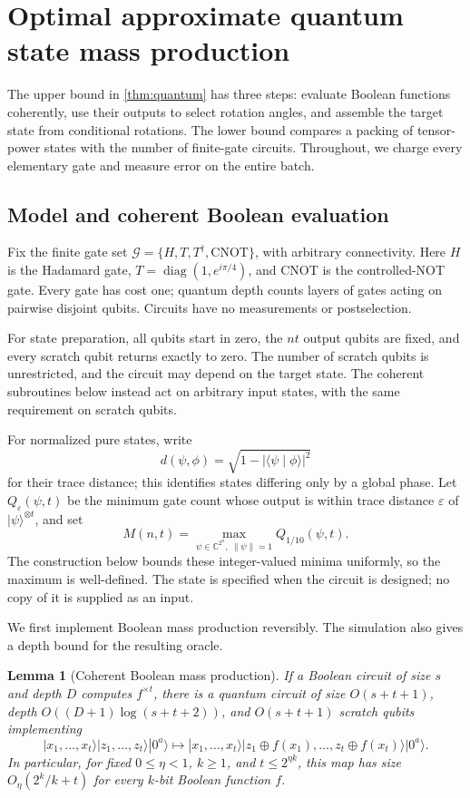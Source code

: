 \documentclass[11pt]{article}
\newtheorem{lemma}[lemma]{Lemma}
\newcommand{\xor}{\mathbin{\oplus}}
\begin{document}
\section{Optimal approximate quantum state mass production}
\label{sec:quantum}

The upper bound in \cref{thm:quantum} has three steps: evaluate Boolean
functions coherently, use their outputs to select rotation angles, and
assemble the target state from conditional rotations.  The lower bound
compares a packing of tensor-power states with the number of finite-gate
circuits.  Throughout, we charge every elementary gate and measure error
on the entire batch.

\subsection{Model and coherent Boolean evaluation}

Fix the finite gate set
$\mathcal G=\{H,T,T^\dagger,\mathrm{CNOT}\}$, with arbitrary connectivity.
Here $H$ is the Hadamard gate, $T=\operatorname{diag}(1,e^{i\pi/4})$,
and CNOT is the controlled-NOT gate.  Every gate has cost one; quantum
depth counts layers of gates acting on pairwise disjoint qubits.
Circuits have no measurements or postselection.

For state preparation, all qubits start in zero, the $nt$ output qubits
are fixed, and every scratch qubit returns exactly to zero.  The number
of scratch qubits is unrestricted, and the circuit may depend on the
target state.  The coherent subroutines below instead act on arbitrary
input states, with the same requirement on scratch qubits.

For normalized pure states, write
\[
 d(\psi,\phi)=\sqrt{1-|\langle\psi\mid\phi\rangle|^2}
\]
for their trace distance; this identifies states differing only by a
global phase.  Let $Q_\varepsilon(\psi,t)$ be the minimum gate count
whose output is within trace distance $\varepsilon$ of
$|\psi\rangle^{\otimes t}$, and set
\[
 M(n,t)=\max_{\psi\in\mathbb C^{2^n},\ \|\psi\|=1}
                   Q_{1/10}(\psi,t).
\]
The construction below bounds these integer-valued minima uniformly,
so the maximum is well-defined.  The state is specified when the circuit
is designed; no copy of it is supplied as an input.

We first implement Boolean mass production reversibly.  The simulation
also gives a depth bound for the resulting oracle.

\begin{lemma}[Coherent Boolean mass production]\label{lem:coherent}
If a Boolean circuit of size $s$ and depth $D$ computes $f^{\times t}$,
there is a quantum circuit of size $O(s+t+1)$, depth
$O((D+1)\log(s+t+2))$, and $O(s+t+1)$ scratch qubits implementing
\[
 |x_1,\ldots,x_t\rangle|z_1,\ldots,z_t\rangle|0^a\rangle
 \longmapsto
 |x_1,\ldots,x_t\rangle
 |z_1\xor f(x_1),\ldots,z_t\xor f(x_t)\rangle|0^a\rangle.
\]
In particular, for fixed $0\le\eta<1$, $k\ge1$, and
$t\le2^{\eta k}$, this map has size $O_\eta(2^k/k+t)$ for every
$k$-bit Boolean function $f$.
\end{lemma}
\end{document}
